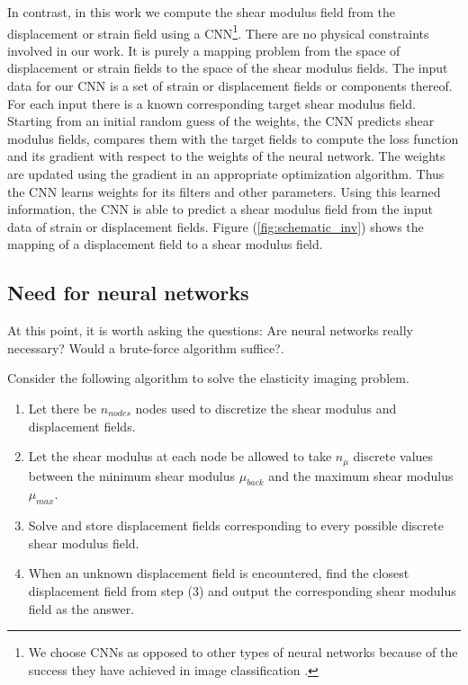 \documentclass[10pt]{article}
\begin{document}
In contrast, in this work we compute the shear modulus field from the displacement or strain field using a CNN\footnote{We choose CNNs as opposed to other types of neural networks because of the success they have achieved in image classification \cite{paper:hinton2017}.}. There are no physical constraints involved in our work. It is purely a mapping problem from the space of displacement or strain fields to the space of the shear modulus fields. The input data for our CNN is a set of strain or displacement fields or components thereof. For each input there is a known corresponding target shear modulus field. Starting from an initial random guess of the weights, the CNN predicts shear modulus fields, compares them with the target fields to compute the loss function and its gradient with respect to the weights of the neural network. The weights are updated using the gradient in an appropriate optimization algorithm. Thus the CNN learns weights for its filters and other parameters. Using this learned information, the CNN is able to predict a shear modulus field from the input data of strain or displacement fields. Figure (\ref{fig:schematic_inv}) shows the mapping of a displacement field to a shear modulus field.\\
\subsection{Need for neural networks}
At this point, it is worth asking the questions: Are neural networks really necessary? Would a brute-force algorithm suffice?.

Consider the following algorithm to solve the elasticity imaging problem.
%
\begin{enumerate}
\item{Let there be $n_{nodes}$ nodes used to discretize the shear modulus and displacement fields.}
\item{Let the shear modulus at each node be allowed to take $n_{\mu}$ discrete values between the minimum shear modulus $\mu_{back}$ and the maximum shear modulus $\mu_{max}$.}
\item{Solve and store displacement fields corresponding to every possible discrete shear modulus field.}
\item{When an unknown displacement field is encountered, find the closest displacement field from step (3) and output the corresponding shear modulus field as the answer.}
\end{enumerate}
\end{document}
